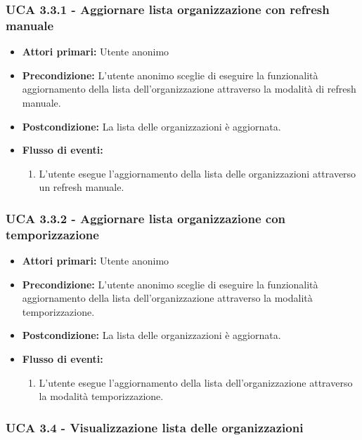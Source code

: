 \subsubsection{UCA 3.3.1 - Aggiornare lista organizzazione con refresh manuale}%
\begin{itemize}
	\item \textbf{Attori primari:} Utente anonimo
	\item \textbf{Precondizione:} L'utente anonimo sceglie di eseguire la funzionalità aggiornamento della lista dell'organizzazione attraverso la modalità di refresh manuale.
	\item \textbf{Postcondizione:} La lista delle organizzazioni è aggiornata.	
	\item \textbf{Flusso di eventi:}
	\begin{enumerate}
		\item L'utente esegue l'aggiornamento della lista delle organizzazioni attraverso un refresh manuale.
	\end{enumerate}
	
\end{itemize}

\subsubsection{UCA 3.3.2 - Aggiornare lista organizzazione con temporizzazione}%
\begin{itemize} 
	\item \textbf{Attori primari:} Utente anonimo
	\item \textbf{Precondizione:} L'utente anonimo sceglie di eseguire la funzionalità aggiornamento della lista dell'organizzazione attraverso la modalità temporizzazione.
	\item \textbf{Postcondizione:} La lista delle organizzazioni è aggiornata.
	\item \textbf{Flusso di eventi:}
	\begin{enumerate}
		\item L'utente esegue l'aggiornamento della lista dell'organizzazione attraverso la modalità temporizzazione.
	\end{enumerate}
\end{itemize}

\subsubsection{UCA 3.4 - Visualizzazione lista delle organizzazioni}%

